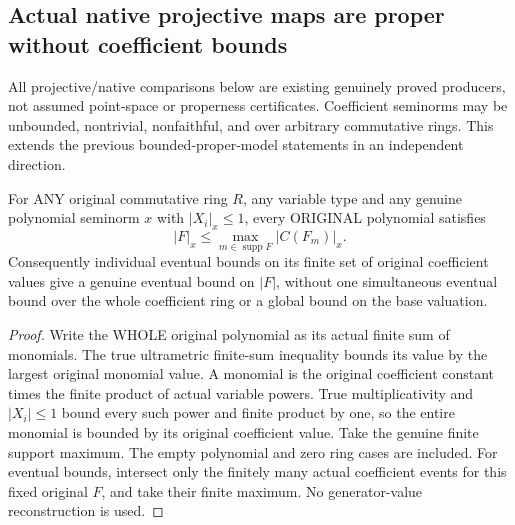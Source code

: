 \subsection{Actual native projective maps are proper without coefficient bounds}

All projective/native comparisons below are existing genuinely proved producers,
not assumed point-space or properness certificates. Coefficient seminorms may be
unbounded, nontrivial, nonfaithful, and over arbitrary commutative rings. This
extends the previous bounded-proper-model statements in an independent direction.

\begin{lemma}
\label{spectrum:normalized-projective-polynomial-bounds}
For ANY original commutative ring $R$, any variable type and any genuine polynomial
seminorm $x$ with $|X_i|_x\le1$, every ORIGINAL polynomial satisfies
\[
 |F|_x\le \max_{m\in\operatorname{supp}F}|C(F_m)|_x.
\]
Consequently individual eventual bounds on its finite set of original coefficient
values give a genuine eventual bound on $|F|$, without one simultaneous eventual
bound over the whole coefficient ring or a global bound on the base valuation.
\leanok
\end{lemma}
\begin{proof}
Write the WHOLE original polynomial as its actual finite sum of monomials. The
true ultrametric finite-sum inequality bounds its value by the largest original
monomial value. A monomial is the original coefficient constant times the finite
product of actual variable powers. True multiplicativity and $|X_i|\le1$ bound
every such power and finite product by one, so the entire monomial is bounded by
its original coefficient value. Take the genuine finite support maximum. The
empty polynomial and zero ring cases are included. For eventual bounds, intersect
only the finitely many actual coefficient events for this fixed original $F$,
and take their finite maximum. No generator-value reconstruction is used.
\end{proof}

